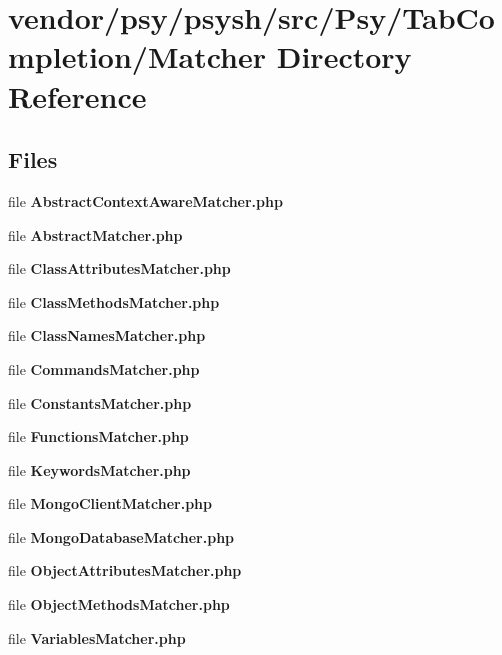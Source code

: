 \section{vendor/psy/psysh/src/\+Psy/\+Tab\+Completion/\+Matcher Directory Reference}
\label{dir_01ddaa200babcb4937f883917ff4729a}
\subsection*{Files}
\begin{DoxyCompactItemize}
\item 
file {\bf Abstract\+Context\+Aware\+Matcher.\+php}
\item 
file {\bf Abstract\+Matcher.\+php}
\item 
file {\bf Class\+Attributes\+Matcher.\+php}
\item 
file {\bf Class\+Methods\+Matcher.\+php}
\item 
file {\bf Class\+Names\+Matcher.\+php}
\item 
file {\bf Commands\+Matcher.\+php}
\item 
file {\bf Constants\+Matcher.\+php}
\item 
file {\bf Functions\+Matcher.\+php}
\item 
file {\bf Keywords\+Matcher.\+php}
\item 
file {\bf Mongo\+Client\+Matcher.\+php}
\item 
file {\bf Mongo\+Database\+Matcher.\+php}
\item 
file {\bf Object\+Attributes\+Matcher.\+php}
\item 
file {\bf Object\+Methods\+Matcher.\+php}
\item 
file {\bf Variables\+Matcher.\+php}
\end{DoxyCompactItemize}
